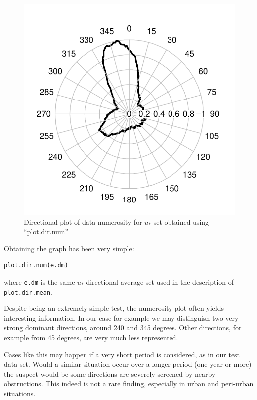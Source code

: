 \documentclass[a4paper,10pt]{book}
\begin{document}
\begin{figure}[htp]
 \centering
 \begin{center}
 \includegraphics[scale=1,keepaspectratio=true]{./diagrams/DirNumUstar.pdf}
 \end{center}
 \caption{Directional plot of data numerosity for $u_{*}$ set obtained using ``plot.dir.num''}
 \label{fig:Numerosity plot}
\end{figure}

Obtaining the graph has been very simple:

\begin{verbatim}
plot.dir.num(e.dm)
\end{verbatim}

\noindent where \verb|e.dm| is the same $u_{*}$ directional average set used in the description of \verb|plot.dir.mean|.

Despite being an extremely simple test, the numerosity plot often yields interesting information. In our case for example we may distinguish two very strong dominant directions, around 240 and 345 degrees. Other directions, for example from 45 degrees, are very much less represented.

Cases like this may happen if a very short period is considered, as in our test data set. Would a similar situation occur over a longer period (one year or more) the suspect would be some directions are severely screened by nearby obstructions. This indeed is not a rare finding, especially in urban and peri-urban situations.
\end{document}
